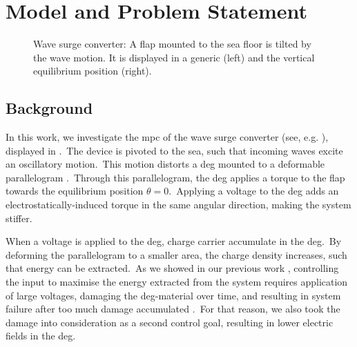 \section{Model and Problem Statement}

\begin{figure}[htb]
	\centering
	\fontsize{9}{0}\selectfont
	\def\svgwidth{0.5\textwidth}
	
	\caption{Wave surge converter: A flap mounted to the sea floor is tilted by the wave motion. It is displayed in a generic (left) and the vertical equilibrium position (right).}%
\label{fig:flap}
\end{figure}

\subsection{Background}
In this work, we investigate the \ac{mpc} of the wave surge converter (see, e.g. \cite{Whittaker2012}), displayed in .\ 
The device is pivoted to the sea, such that incoming waves excite an oscillatory motion.\ 
This motion distorts a \ac{deg} mounted to a deformable parallelogram \cite{Moretti2014}.\ 
Through this parallelogram, the \ac{deg} applies a torque to the flap towards the equilibrium position $\theta=0$.\ 
Applying a voltage to the \ac{deg} adds an electrostatically-induced torque in the same angular direction, making the system stiffer.\ 

When a voltage is applied to the \ac{deg}, charge carrier accumulate in the \ac{deg}.\ 
By deforming the parallelogram to a smaller area, the charge density increases, such that energy can be extracted.\  
As we showed in our previous work \cite{Hoffmann2022moocp_wcdeg}, controlling the input to maximise the energy extracted from the system requires application of large voltages, damaging the \ac{deg}-material over time, and resulting in system failure after too much damage accumulated \cite{Chen2019}.\
For that reason, we also took the damage into consideration as a second control goal, resulting in lower electric fields in the \ac{deg}.

